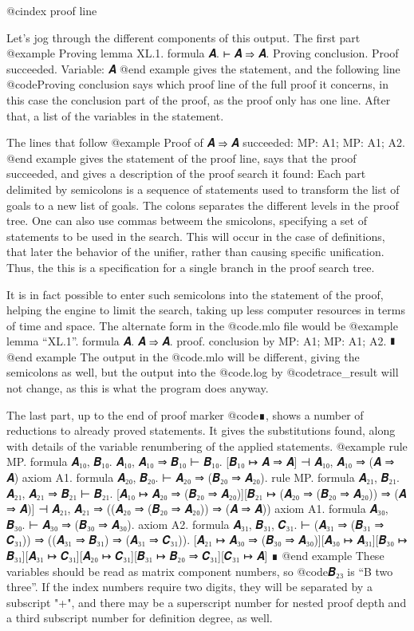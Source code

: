 @cindex proof line

Let's jog through the different components of this output. The first part
@example
Proving lemma XL.1. formula 𝑨.
  ⊢ 𝑨 ⇒ 𝑨.
Proving conclusion.
Proof succeeded.
Variable: 𝑨
@end example
gives the statement, and the following line @code{Proving conclusion} says which proof line of the full proof it concerns, in this case the conclusion part of the proof, as the proof only has one line. After that, a list of the variables in the statement.

The lines that follow
@example
Proof of
  𝑨 ⇒ 𝑨
succeeded:
  MP: A1; MP: A1; A2.
@end example
gives the statement of the proof line, says that the proof succeeded, and gives a description of the proof search it found: Each part delimited by semicolons is a sequence of statements used to transform the list of goals to a new list of goals. The colons separates the different levels in the proof tree. One can also use commas betweem the smicolons, specifying a set of statements to be used in the search. This will occur in the case of definitions, that later the behavior of the unifier, rather than causing specific unification. Thus, the this is a specification for a single branch in the proof search tree.

It is in fact possible to enter such semicolons into the statement of the proof, helping the engine to limit the search, taking up less computer resources in terms of time and space. The alternate form in the @code{.mlo} file would be
@example
lemma “XL.1”. formula 𝑨. 𝑨 ⇒ 𝑨.
proof.
  conclusion by MP: A1; MP: A1; A2.
∎
@end example
The output in the @code{.mlo} will be different, giving the semicolons as well, but the output into the @code{.log} by @code{trace_result} will not change, as this is what the program does anyway.

The last part, up to the end of proof marker @code{∎}, shows a number of reductions to already proved statements. It gives the substitutions found, along with details of the variable renumbering of the applied statements.
@example
rule MP. formula 𝑨₁₀, 𝑩₁₀.
  𝑨₁₀, 𝑨₁₀ ⇒ 𝑩₁₀ ⊢ 𝑩₁₀.
[𝑩₁₀ ↦ 𝑨 ⇒ 𝑨]
 ⊣ 𝑨₁₀, 𝑨₁₀ ⇒ (𝑨 ⇒ 𝑨)
axiom A1. formula 𝑨₂₀, 𝑩₂₀.
  ⊢ 𝑨₂₀ ⇒ (𝑩₂₀ ⇒ 𝑨₂₀).
rule MP. formula 𝑨₂₁, 𝑩₂₁.
  𝑨₂₁, 𝑨₂₁ ⇒ 𝑩₂₁ ⊢ 𝑩₂₁.
[𝑨₁₀ ↦ 𝑨₂₀ ⇒ (𝑩₂₀ ⇒ 𝑨₂₀)][𝑩₂₁ ↦ (𝑨₂₀ ⇒ (𝑩₂₀ ⇒ 𝑨₂₀)) ⇒ (𝑨 ⇒ 𝑨)]
 ⊣ 𝑨₂₁, 𝑨₂₁ ⇒ ((𝑨₂₀ ⇒ (𝑩₂₀ ⇒ 𝑨₂₀)) ⇒ (𝑨 ⇒ 𝑨))
axiom A1. formula 𝑨₃₀, 𝑩₃₀.
  ⊢ 𝑨₃₀ ⇒ (𝑩₃₀ ⇒ 𝑨₃₀).
axiom A2. formula 𝑨₃₁, 𝑩₃₁, 𝑪₃₁.
  ⊢ (𝑨₃₁ ⇒ (𝑩₃₁ ⇒ 𝑪₃₁)) ⇒ ((𝑨₃₁ ⇒ 𝑩₃₁) ⇒ (𝑨₃₁ ⇒ 𝑪₃₁)).
[𝑨₂₁ ↦ 𝑨₃₀ ⇒ (𝑩₃₀ ⇒ 𝑨₃₀)][𝑨₃₀ ↦ 𝑨₃₁][𝑩₃₀ ↦ 𝑩₃₁][𝑨₃₁ ↦ 𝑪₃₁][𝑨₂₀ ↦ 𝑪₃₁][𝑩₃₁ ↦ 𝑩₂₀ ⇒ 𝑪₃₁][𝑪₃₁ ↦ 𝑨]
∎
@end example
These variables should be read as matrix component numbers, so @code{𝑩₂₃} is “B two three”. If the index numbers require two digits, they will be separated by a subscript "+", and there may be a superscript number for nested proof depth and a third subscript number for definition degree, as well.

